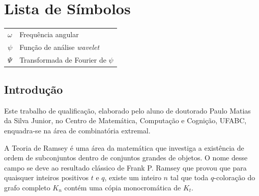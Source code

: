 \documentclass[11pt,twoside,a4paper]{book}
\theoremstyle{note}
\begin{document}
\chapter{Lista de Símbolos}
\begin{tabular}{ll}
        $\omega$    & Frequência angular\\
        $\psi$      & Função de análise \emph{wavelet}\\
        $\Psi$      & Transformada de Fourier de $\psi$\\
\end{tabular}

\listoffigures            
\listoftables            

\mainmatter

\fancyhead[RE,LO]{\thesection}

\singlespacing              %





\section{Introdução}
\label{sec:intro}

Este trabalho de qualificação, elaborado pelo aluno de doutorado Paulo Matias da Silva Junior, no Centro de Matemática, Computação e Cognição, UFABC, enquadra-se na área de
combinatória extremal.

A Teoria de Ramsey é uma área da matemática que investiga a existência de ordem de subconjuntos dentro de conjuntos grandes de objetos.
O nome desse campo se deve ao resultado clássico de Frank P. Ramsey \cite{Ra} que provou que para quaisquer inteiros positivos $t$ e $q$, existe um inteiro $n$ tal que toda $q$-coloração do grafo completo $K_n$ contém uma cópia monocromática de $K_t$.

\end{document}
